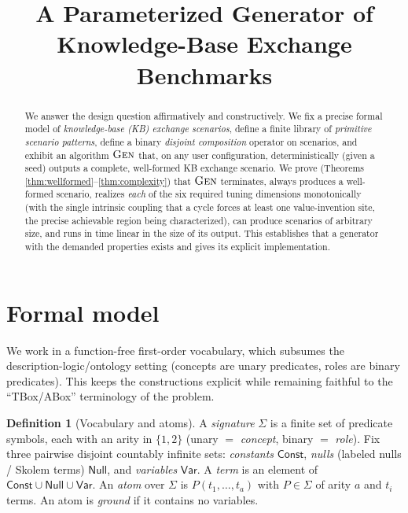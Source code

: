 \documentclass{amsart}
\theoremstyle{definition}
\newtheorem{definition}{Definition}
\newcommand{\Sig}{\Sigma}
\begin{document}
\title{A Parameterized Generator of Knowledge-Base Exchange Benchmarks}
\author{}
\date{}
\maketitle

\begin{abstract}
We answer the design question affirmatively and constructively. We fix a precise
formal model of \emph{knowledge-base (KB) exchange scenarios}, define a finite
library of \emph{primitive scenario patterns}, define a binary \emph{disjoint
composition} operator on scenarios, and exhibit an algorithm $\textsc{Gen}$ that,
on any user configuration, deterministically (given a seed) outputs a complete,
well-formed KB exchange scenario. We prove (Theorems
\ref{thm:wellformed}--\ref{thm:complexity}) that $\textsc{Gen}$ terminates, always
produces a well-formed scenario, realizes \emph{each} of the six required tuning
dimensions monotonically (with the single intrinsic coupling that a cycle forces
at least one value-invention site, the precise achievable region being
characterized), can produce scenarios of arbitrary size, and runs in time linear in the size of its output. This establishes that a
generator with the demanded properties exists and gives its explicit
implementation.
\end{abstract}

\section{Formal model}\label{sec:model}

We work in a function-free first-order vocabulary, which subsumes the
description-logic/ontology setting (concepts are unary predicates, roles are
binary predicates). This keeps the constructions explicit while remaining
faithful to the ``TBox/ABox'' terminology of the problem.

\begin{definition}[Vocabulary and atoms]\label{def:vocab}
A \emph{signature} $\Sig$ is a finite set of predicate symbols, each with an
arity in $\{1,2\}$ (unary $=$ \emph{concept}, binary $=$ \emph{role}). Fix three
pairwise disjoint countably infinite sets: \emph{constants} $\mathsf{Const}$,
\emph{nulls} (labeled nulls / Skolem terms) $\mathsf{Null}$, and \emph{variables}
$\mathsf{Var}$. A \emph{term} is an element of
$\mathsf{Const}\cup\mathsf{Null}\cup\mathsf{Var}$. An \emph{atom} over $\Sig$ is
$P(t_1,\dots,t_a)$ with $P\in\Sig$ of arity $a$ and $t_i$ terms. An atom is
\emph{ground} if it contains no variables.
\end{definition}
\end{document}
